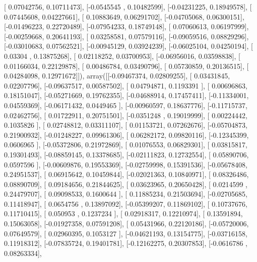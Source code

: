 \documentclass{article}
\begin{document}
       [ 0.07042756,  0.10711473],
       [-0.0545545 ,  0.10482599],
       [-0.04231225,  0.18949578],
       [ 0.07445608,  0.04227661],
       [ 0.10883649,  0.06291702],
       [-0.04705068,  0.06300151],
       [-0.01496223,  0.22720489],
       [-0.07954233,  0.18749148],
       [ 0.07060613,  0.06197999],
       [-0.00259668,  0.20641193],
       [ 0.03258581,  0.07579116],
       [-0.09059516,  0.08829296],
       [-0.03010683,  0.07562521],
       [-0.00945129,  0.03924239],
       [-0.06025104,  0.04250194],
       [ 0.03304   ,  0.13875268],
       [ 0.02118252,  0.03700953],
       [-0.06956016,  0.03598838],
       [ 0.01166034,  0.22129878],
       [ 0.00486784,  0.03490796],
       [ 0.05730859,  0.20136515],
       [ 0.04284098,  0.12971672]]), array([[-0.09467374,  0.02809255],
       [ 0.03431845,  0.02207796],
       [-0.09637517,  0.00587502],
       [ 0.04794871,  0.1193391 ],
       [ 0.00696863,  0.18151047],
       [-0.05271669,  0.19762355],
       [-0.04688914,  0.17457411],
       [-0.11334001,  0.04559369],
       [-0.06171432,  0.0449465 ],
       [-0.00960597,  0.18637776],
       [-0.11715737,  0.02462756],
       [ 0.01722911,  0.20751501],
       [-0.0351248 ,  0.19019999],
       [ 0.00224442,  0.1035826 ],
       [ 0.02748812,  0.03311107],
       [ 0.01153721,  0.07262676],
       [-0.05704873,  0.21900932],
       [-0.01248227,  0.09961306],
       [ 0.06282172,  0.09820116],
       [-0.12345399,  0.0606965 ],
       [-0.05372806,  0.21972869],
       [ 0.01076553,  0.06829301],
       [ 0.03815817,  0.19301493],
       [-0.08859145,  0.13378685],
       [-0.02111823,  0.12732554],
       [ 0.05890706,  0.0597596 ],
       [-0.00609876,  0.19553369],
       [-0.02759998,  0.15391536],
       [-0.05678408,  0.24951537],
       [ 0.06915642,  0.10459844],
       [-0.02021363,  0.10840971],
       [ 0.08326486,  0.08890709],
       [ 0.09184656,  0.21844625],
       [ 0.03623965,  0.20650428],
       [ 0.0214599 ,  0.24479707],
       [ 0.09098533,  0.1600644 ],
       [ 0.11885234,  0.21503694],
       [-0.02705685,  0.11418947],
       [ 0.0654756 ,  0.13897092],
       [-0.05399207,  0.11869102],
       [ 0.10737676,  0.11710415],
       [ 0.050953  ,  0.1237234 ],
       [ 0.02918317,  0.12210974],
       [ 0.13591894,  0.15063058],
       [-0.01927358,  0.07591208],
       [ 0.05431966,  0.22120186],
       [-0.05720006,  0.07649579],
       [ 0.02960395,  0.1053127 ],
       [-0.04621193,  0.13154775],
       [-0.03716158,  0.11918312],
       [-0.07835724,  0.19401781],
       [-0.12162275,  0.20307853],
       [-0.0616786 ,  0.08263334],
\end{document}

